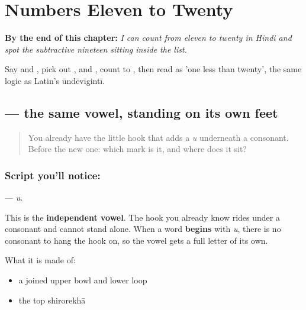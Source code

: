 
\chapter{Numbers Eleven to Twenty}
\label{ch:hi-numbers-eleven-to-twenty}

\begin{chapteropening}
\textbf{By the end of this chapter:} \emph{I can count from eleven to twenty in Hindi and spot the subtractive nineteen sitting inside the list.}

Say  and , pick out ,  and , count  to , then read  as 'one less than twenty', the same logic as Latin's ūndēvīgintī.
\end{chapteropening}

\section[\texorpdfstring{\hi{उ} (u)}{उ (u)}]{ — the same vowel, standing on its own feet}

\label{lesson:HI-S127-letter-u}



\begin{quote}
You already have the little hook that adds a \emph{u} underneath a consonant. Before the new one: which mark is it, and where does it sit?
\end{quote}

\subsection*{Script you'll notice: }
\textbf{} — \emph{u}.

This is the \textbf{independent vowel}. The hook you already know rides under a consonant and cannot stand alone. When a word \textbf{begins} with \emph{u}, there is no consonant to hang the hook on, so the vowel gets a full letter of its own.

What it is made of:

\begin{itemize}
\raggedright
  \item a joined upper bowl and lower loop
  \item the top shirorekhā
\end{itemize}

